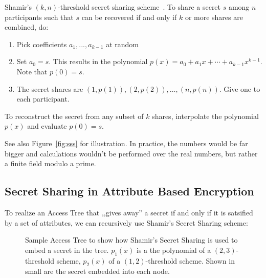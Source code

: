 \begin{definition}
    Shamir's $(k, n)$-threshold secret sharing scheme~\cite{shamir_how_1979}.
    To share a secret $s$ among $n$ participants such that $s$ can be recovered if and only if $k$ or more shares are combined, do:
    \begin{enumerate}
        \item Pick coefficients $a_1, ..., a_{k-1}$ at random 
        \item Set $a_0 = s$. This results in the polynomial $p(x) = a_0 + a_1x + \cdots + a_{k-1}x^{k-1}$. Note that $p(0) = s$.
        \item The secret shares are $(1, p(1)), (2, p(2)), \dots, (n, p(n))$. Give one to each participant.
    \end{enumerate}
    To reconstruct the secret from any subset of $k$ shares, interpolate the polynomial $p(x)$ and evaluate $p(0) = s$. 
\end{definition}

See also Figure~\ref{fig:sss} for illustration.
In practice, the numbers would be far bigger and calculations wouldn't be performed over the real numbers, but rather a finite field modulo a prime.~\cite{shamir_how_1979}

\subsection{Secret Sharing in Attribute Based Encryption}
To realize an Access Tree that ,,gives away'' a secret if and only if it is satsified by a set of attributes, we can recursively use Shamir's Secret Sharing scheme:

\begin{figure}
    \centering
    \caption[Shamir's Secret sharing in ABE]{
        Sample Access Tree to show how Shamir's Secret Sharing is used to embed a secret in the tree.
        $p_1(x)$ is a the polynomial of a $(2,3)$-threshold scheme, $p_2(x)$ of a $(1,2)$-threshold scheme.
        Shown in small are the secret embedded into each node.
    }
    \label{fig:sample-access-tree}
\end{figure}

